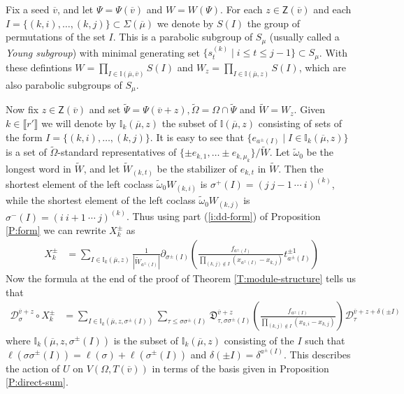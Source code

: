 \documentclass[11pt,fleqn]{amsart}
\newcounter{para}[section]
\newcommand\II{\mathbb I}
\newcommand\D[3]{{}^{#1} \mathfrak D_{#2}^{#3}}
\newcommand\DD[3]{{}^{#1} \mathcal D_{#2}^{#3}}
\newcommand\Z{\mathsf Z}
\newcommand\vv{\overline{v}}
\newcommand\interval[1]{\llbracket #1 \rrbracket}
\begin{document}
Fix a seed $\vv$, and let $\Psi = \Psi(\vv)$ and $W = W(\Psi)$. For each 
$z \in \Z(\vv)$ and each $I = \{(k,i), \ldots, (k,j)\} \subset \Sigma(\overline
\mu)$ we denote by $S(I)$ the group of permutations of the set $I$. This is a 
parabolic subgroup of $S_\mu$ (usually called a \emph{Young subgroup}) with 
minimal generating set $\{s_t^{(k)} \mid i \leq t \leq j - 1\} \subset S_\mu$. 
With these defintions $W = \prod_{I \in \II(\overline \mu, \vv)} S(I)$ and 
$W_z = \prod_{I \in \II(\overline \mu, z)} S(I)$, which are also parabolic 
subgroups of $S_\mu$. 

Now fix $z \in \Z(\vv)$ and set $\widetilde \Psi = \Psi(\vv + z), \widetilde \Omega =
\Omega \cap \widetilde \Psi$ and $\widetilde W = W_z$. Given $k \in \interval{r'}$ we 
will denote by $\II_k(\overline \mu, z)$ the subset of $\II(\overline \mu, z)$ 
consisting of sets of the form $I = \{(k,i), \ldots, (k,j)\}$. It is easy to 
see that $\{e_{a^\pm(I)} \mid I \in \II_k(\overline \mu, z)\}$ is a set of 
$\widetilde \Omega$-standard representatives of $\{\pm e_{k,1}, \ldots \pm 
e_{k,\mu_k}\}/\widetilde W$. Let $\widetilde \omega_0$ be the longest word in 
$\widetilde W$, and let $\widetilde W_{(k,t)}$ be the stabilizer of $e_{k,t}$ in 
$\widetilde W$. Then the shortest element of the left coclass $\widetilde \omega_0
W_{(k,i)}$ is $\sigma^+(I) = (j \ j-1 \ \cdots \ i)^{(k)}$, while the
shortest element of the left coclass $\widetilde \omega_0 W_{(k,j)}$ is 
$\sigma^-(I) = (i \ i+1 \  \cdots \ j)^{(k)}$. Thus using part 
(\ref{i:dd-form}) of Proposition \ref{P:form} we can rewrite $X_k^\pm$ as
\begin{align*}
X^\pm_k
	&= \sum_{I \in \II_k(\overline \mu, z)}
		\frac{1}{|\widetilde W_{a^\pm(I)}|} \partial_{\sigma^\pm(I)}
		 \left(
		 	\frac{f_{a^{\pm}(I)}}
		 	{\displaystyle \prod_{(k,j) \notin I} (x_{a^\pm(I)}-x_{k,j})}
		 		t_{a^{\pm}(I)}^{\pm 1}
		 \right)
\end{align*}
Now the formula at the end of the proof of Theorem \ref{T:module-structure} 
tells us that
\begin{align*}
\DD{}{\sigma}{\vv+z} \circ X_k^\pm
	&= \sum_{I \in \II_k(\overline \mu, z, \sigma^\pm(I))}
		\sum_{\tau \leq \sigma \sigma^\pm(I)}
			\D{}{\tau, \sigma \sigma^\pm(I)}{\vv + z} \left( 
				\frac{f_{a^\pm(I)}}{\displaystyle
					\prod_{(k,j) \notin I} (x_{k,i} - x_{k,j})} 
			\right) \DD{}{\tau}{\vv + z + \delta(\pm I)}
\end{align*}
where $\II_k(\overline \mu, z, \sigma^\pm(I))$ is the subset of 
$\II_k(\overline \mu, z)$ consisting of the $I$ such that $\ell(\sigma 
\sigma^\pm(I)) = \ell(\sigma) + \ell(\sigma^\pm(I))$ and $\delta(\pm I) = 
\delta^{a^\pm(I)}$. This describes the action of $U$ on $V(\Omega, T(\vv))$ in 
terms of the basis given in Proposition \ref{P:direct-sum}.
\end{document}
